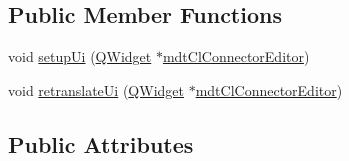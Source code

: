 \subsection*{Public Member Functions}
\begin{DoxyCompactItemize}
\item 
void \hyperlink{class_ui__mdt_cl_connector_editor_a9aff007152d61cd941197aa9b7b58414}{setup\-Ui} (\hyperlink{class_q_widget}{Q\-Widget} $\ast$\hyperlink{classmdt_cl_connector_editor}{mdt\-Cl\-Connector\-Editor})
\item 
void \hyperlink{class_ui__mdt_cl_connector_editor_a998d678eac6689eb48740dca3dbf4357}{retranslate\-Ui} (\hyperlink{class_q_widget}{Q\-Widget} $\ast$\hyperlink{classmdt_cl_connector_editor}{mdt\-Cl\-Connector\-Editor})
\end{DoxyCompactItemize}
\subsection*{Public Attributes}
